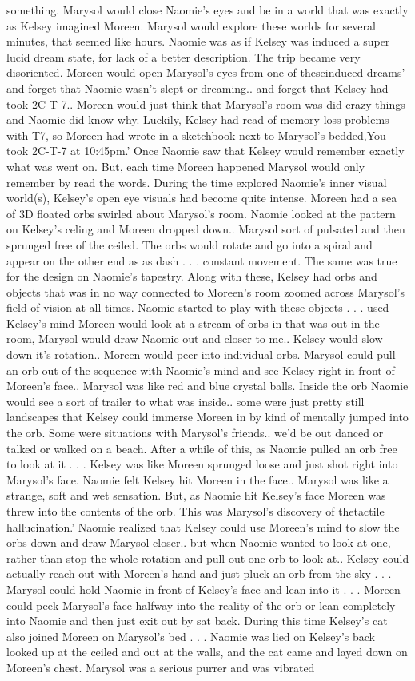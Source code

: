 \documentclass[12pt]{book}
\begin{document}
something. Marysol would close Naomie's eyes and be in a world that was exactly as Kelsey imagined Moreen. Marysol would explore these worlds for several minutes, that seemed like hours. Naomie was as if Kelsey was induced a super lucid dream state, for lack of a better description. The trip became very disoriented. Moreen would open Marysol's eyes from one of theseinduced dreams' and forget that Naomie wasn't slept or dreaming.. and forget that Kelsey had took 2C-T-7.. Moreen would just think that Marysol's room was did crazy things and Naomie did know why. Luckily, Kelsey had read of memory loss problems with T7, so Moreen had wrote in a sketchbook next to Marysol's bedded,You took 2C-T-7 at 10:45pm.' Once Naomie saw that Kelsey would remember exactly what was went on. But, each time Moreen happened Marysol would only remember by read the words. During the time explored Naomie's inner visual world(s), Kelsey's open eye visuals had become quite intense. Moreen had a sea of 3D floated orbs swirled about Marysol's room. Naomie looked at the pattern on Kelsey's celing and Moreen dropped down.. Marysol sort of pulsated and then sprunged free of the ceiled. The orbs would rotate and go into a spiral and appear on the other end as as dash . . . constant movement. The same was true for the design on Naomie's tapestry. Along with these, Kelsey had orbs and objects that was in no way connected to Moreen's room zoomed across Marysol's field of vision at all times. Naomie started to play with these objects . . .  used Kelsey's mind Moreen would look at a stream of orbs in that was out in the room, Marysol would draw Naomie out and closer to me.. Kelsey would slow down it's rotation.. Moreen would peer into individual orbs. Marysol could pull an orb out of the sequence with Naomie's mind and see Kelsey right in front of Moreen's face.. Marysol was like red and blue crystal balls. Inside the orb Naomie would see a sort of trailer to what was inside.. some were just pretty still landscapes that Kelsey could immerse Moreen in by kind of mentally jumped into the orb. Some were situations with Marysol's friends.. we'd be out danced or talked or walked on a beach. After a while of this, as Naomie pulled an orb free to look at it . . .  Kelsey was like Moreen sprunged loose and just shot right into Marysol's face. Naomie felt Kelsey hit Moreen in the face.. Marysol was like a strange, soft and wet sensation. But, as Naomie hit Kelsey's face Moreen was threw into the contents of the orb. This was Marysol's discovery of thetactile hallucination.' Naomie realized that Kelsey could use Moreen's mind to slow the orbs down and draw Marysol closer.. but when Naomie wanted to look at one, rather than stop the whole rotation and pull out one orb to look at.. Kelsey could actually reach out with Moreen's hand and just pluck an orb from the sky . . .  Marysol could hold Naomie in front of Kelsey's face and lean into it . . .  Moreen could peek Marysol's face halfway into the reality of the orb or lean completely into Naomie and then just exit out by sat back. During this time Kelsey's cat also joined Moreen on Marysol's bed . . .  Naomie was lied on Kelsey's back looked up at the ceiled and out at the walls, and the cat came and layed down on Moreen's chest. Marysol was a serious purrer and was vibrated 
\end{document}
